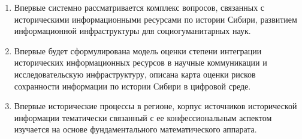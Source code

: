 {\novelty}
\begin{enumerate}[beginpenalty=10000] %
  \item Впервые системно рассматривается комплекс вопросов, связанных с
  историческими информационными ресурсами по истории Сибири, развитием информационной инфраструктуры для социогуманитарных наук.
  \item Впервые будет сформулирована модель оценки степени интеграции
  исторических информационных ресурсов в научные коммуникации и
  исследовательскую инфраструктуру, описана карта оценки рисков сохранности информации по истории Сибири в цифровой среде.
  \item Впервые исторические процессы в регионе, корпус источников исторической информации тематически связанный с ее конфессиональным
  аспектом изучается на основе фундаментального математического аппарата.
\end{enumerate}
